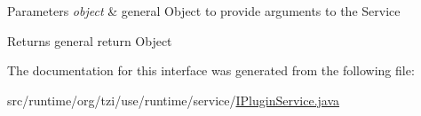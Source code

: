 \begin{DoxyParams}{Parameters}
{\em object} & general Object to provide arguments to the Service \\
\hline
\end{DoxyParams}
\begin{DoxyReturn}{Returns}
general return Object 
\end{DoxyReturn}


The documentation for this interface was generated from the following file\-:\begin{DoxyCompactItemize}
\item 
src/runtime/org/tzi/use/runtime/service/\hyperlink{_i_plugin_service_8java}{I\-Plugin\-Service.\-java}\end{DoxyCompactItemize}
